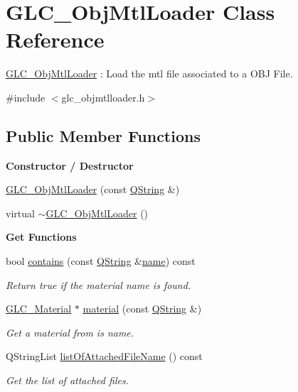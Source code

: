 \hypertarget{class_g_l_c___obj_mtl_loader}{\section{G\-L\-C\-\_\-\-Obj\-Mtl\-Loader Class Reference}
\label{class_g_l_c___obj_mtl_loader}
}


\hyperlink{class_g_l_c___obj_mtl_loader}{G\-L\-C\-\_\-\-Obj\-Mtl\-Loader} \-: Load the mtl file associated to a O\-B\-J File.  




{\ttfamily \#include $<$glc\-\_\-objmtlloader.\-h$>$}

\subsection*{Public Member Functions}
\begin{Indent}{\bf Constructor / Destructor}\par
\begin{DoxyCompactItemize}
\item 
\hyperlink{class_g_l_c___obj_mtl_loader_a7c8f398787af21e7445eef3694f36c33}{G\-L\-C\-\_\-\-Obj\-Mtl\-Loader} (const \hyperlink{group___u_a_v_objects_plugin_gab9d252f49c333c94a72f97ce3105a32d}{Q\-String} \&)
\item 
virtual \hyperlink{class_g_l_c___obj_mtl_loader_aa16a06ad6f298bf23ca7e84b52dafffe}{$\sim$\-G\-L\-C\-\_\-\-Obj\-Mtl\-Loader} ()
\end{DoxyCompactItemize}
\end{Indent}
\begin{Indent}{\bf Get Functions}\par
\begin{DoxyCompactItemize}
\item 
bool \hyperlink{class_g_l_c___obj_mtl_loader_a4a106e85a0260e380f363ec2f0766bde}{contains} (const \hyperlink{group___u_a_v_objects_plugin_gab9d252f49c333c94a72f97ce3105a32d}{Q\-String} \&\hyperlink{glext_8h_ad977737dfc9a274a62741b9500c49a32}{name}) const 
\begin{DoxyCompactList}\small\item\em Return true if the material name is found. \end{DoxyCompactList}\item 
\hyperlink{class_g_l_c___material}{G\-L\-C\-\_\-\-Material} $\ast$ \hyperlink{class_g_l_c___obj_mtl_loader_aced999ea23c32b3dfd4961e8a6a973cb}{material} (const \hyperlink{group___u_a_v_objects_plugin_gab9d252f49c333c94a72f97ce3105a32d}{Q\-String} \&)
\begin{DoxyCompactList}\small\item\em Get a material from is name. \end{DoxyCompactList}\item 
Q\-String\-List \hyperlink{class_g_l_c___obj_mtl_loader_a4df4772ac427196461abfd6f2595570e}{list\-Of\-Attached\-File\-Name} () const 
\begin{DoxyCompactList}\small\item\em Get the list of attached files. \end{DoxyCompactList}\end{DoxyCompactItemize}
\end{Indent}
